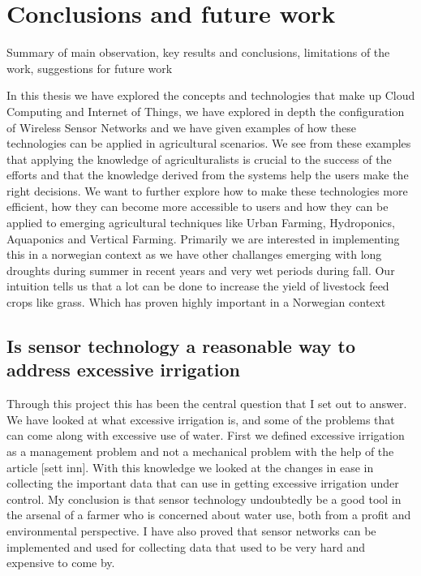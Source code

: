 \documentclass[]{uiophd}
\begin{document}
\chapter{Conclusions and future work}

Summary of main observation, key results and conclusions, limitations of the work, suggestions for future work

In this thesis we have explored the concepts and technologies that make up Cloud Computing and Internet of Things, we have explored in depth the configuration of Wireless Sensor Networks and we have given examples of how these technologies can be applied in agricultural scenarios. We see from these examples that applying the knowledge of agriculturalists is crucial to the success of the efforts and that the knowledge derived from the systems help the users make the right decisions. We want to further explore how to make these technologies more efficient, how they can become more accessible to users and how they can be applied to emerging agricultural techniques like Urban Farming, Hydroponics, Aquaponics and Vertical Farming. Primarily we are interested in implementing this in a norwegian context as we have other challanges emerging with long droughts during summer in recent years and very wet periods during fall. Our intuition tells us that a lot can be done to increase the yield of livestock feed crops like grass. Which has proven highly important in a Norwegian context


\section{ Is sensor technology a reasonable way to address excessive irrigation}

Through this project this has been the central question that I set out to answer. We have looked at what excessive irrigation is, and some of the problems that can come along with excessive use of water. First we defined excessive irrigation as a management problem and not a mechanical problem with the help of the article [sett inn]. With this knowledge we looked at the changes in ease in collecting the important data that can use in getting excessive irrigation under control. My conclusion is that sensor technology undoubtedly be a good tool in the arsenal of a farmer who is concerned about water use, both from a profit and environmental perspective. I have also proved that sensor networks can be implemented and used for collecting data that used to be very hard and expensive to come by.
\end{document}
